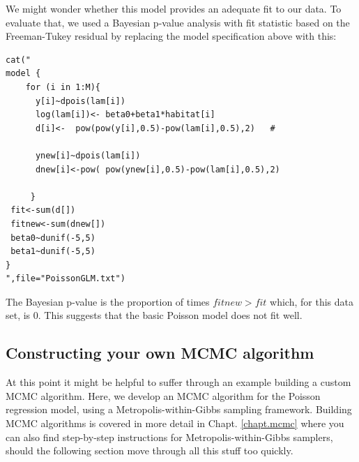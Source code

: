 We might wonder whether this model provides an adequate fit to our
data.  To evaluate that, we used a Bayesian p-value analysis with fit
statistic based on the Freeman-Tukey residual by replacing the model
specification above with this:
{\small
\begin{verbatim}
cat("
model {
    for (i in 1:M){
      y[i]~dpois(lam[i])
      log(lam[i])<- beta0+beta1*habitat[i]
      d[i]<-  pow(pow(y[i],0.5)-pow(lam[i],0.5),2)   #

      ynew[i]~dpois(lam[i])
      dnew[i]<-pow( pow(ynew[i],0.5)-pow(lam[i],0.5),2)

     }
 fit<-sum(d[])
 fitnew<-sum(dnew[])
 beta0~dunif(-5,5)
 beta1~dunif(-5,5)
}
",file="PoissonGLM.txt")
\end{verbatim}
}
The Bayesian p-value is the proportion of times $fitnew > fit$ which,
for this data set, is 0. This suggests that the basic Poisson model does 
not fit well.

\subsection{ Constructing your own MCMC algorithm}

At this point it might be helpful to suffer through an example
building a custom MCMC algorithm. Here, we develop an MCMC algorithm
for
the Poisson regression model, using a Metropolis-within-Gibbs sampling framework. 
Building MCMC algorithms is covered in more detail in Chapt. \ref{chapt.mcmc} where 
you can also find step-by-step instructions for Metropolis-within-Gibbs samplers, 
should the following section move through all this stuff too quickly.  

